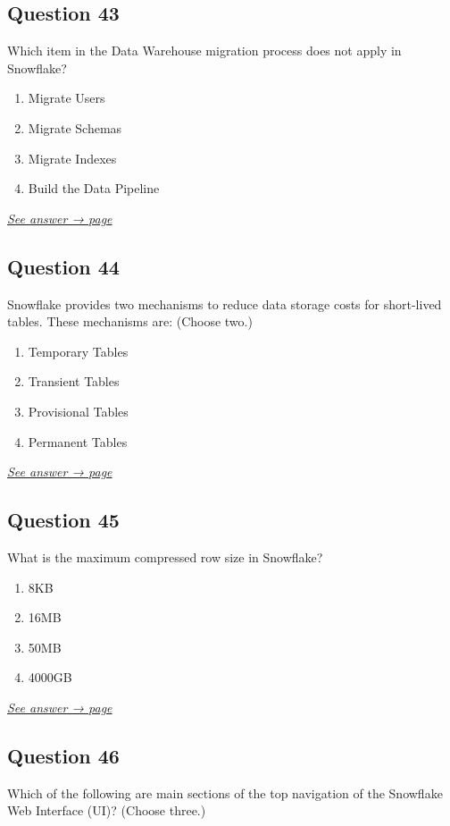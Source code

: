 \documentclass[12pt]{article}
\newcommand{\seeanswer}[1]{%
  \par\smallskip\emph{\hyperref[ans:#1]{See answer → page \pageref{ans:#1}}}%
}
\begin{document}
\subsection*{Question 43}\label{q:43}
Which item in the Data Warehouse migration process does not apply in Snowflake?

\begin{enumerate}[label=\Alph*.]
  \item Migrate Users
  \item Migrate Schemas
  \item Migrate Indexes
  \item Build the Data Pipeline
\end{enumerate}
\seeanswer{43}

\subsection*{Question 44}\label{q:44}
Snowflake provides two mechanisms to reduce data storage costs for short-lived tables. These mechanisms are: (Choose two.)

\begin{enumerate}[label=\Alph*.]
  \item Temporary Tables
  \item Transient Tables
  \item Provisional Tables
  \item Permanent Tables
\end{enumerate}
\seeanswer{44}

\subsection*{Question 45}\label{q:45}
What is the maximum compressed row size in Snowflake?

\begin{enumerate}[label=\Alph*.]
  \item 8KB
  \item 16MB
  \item 50MB
  \item 4000GB
\end{enumerate}
\seeanswer{45}

\subsection*{Question 46}\label{q:46}
Which of the following are main sections of the top navigation of the Snowflake Web Interface (UI)? (Choose three.)
\end{document}
